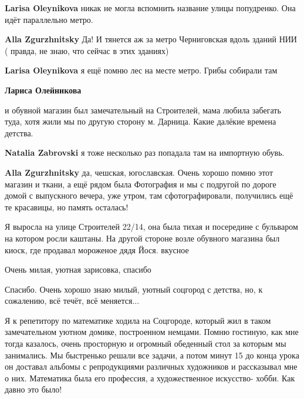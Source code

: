 \begin{itemize}
\begin{itemize} %
\textbf{Larisa Oleynikova} никак не могла вспомнить название улицы попудренко. Она идёт параллельно метро.

\begin{itemize} %
\textbf{Alla Zgurzhnitsky} Да! И тянется аж за метро Черниговская вдоль зданий НИИ ( правда, не знаю, что сейчас в этих зданиях)

\textbf{Larisa Oleynikova} я ещё помню лес на месте метро. Грибы собирали там
\end{itemize} %

\textbf{Лариса Олейникова} 

и обувной магазин был замечательный на Строителей, мама любила забегать туда,
хотя жили мы по другую сторону м. Дарница. Какие далёкие времена детства.

\begin{itemize} %
\textbf{Natalia Zabrovski} я тоже несколько раз попадала там на импортную обувь.

\textbf{Alla Zgurzhnitsky} да, чешская, югославская. Очень хорошо помню этот магазин и ткани, а ещё рядом была Фотография и мы с подругой по дороге домой с выпускного вечера, уже утром, там сфотографировали, получились ещё те красавицы, но память осталась!
\end{itemize} %

\end{itemize} %


Я выросла на улице Строителей 22/14, она была тихая и посередине с бульваром на
котором росли каштаны. На другой стороне возле обувного магазина был киоск,
где продавал мороженое дядя Йося. вкусное

Очень милая, уютная зарисовка, спасибо

Спасибо. Очень хорошо знаю милый, уютный соцгород с детства, но, к сожалению, всё течёт, всё меняется...


Я к репетитору по математике ходила на Соцгороде, который жил в таком
замечательном уютном домике, построенном немцами. Помню гостиную, как мне тогда
казалось, очень просторную и огромный обеденный стол за которым мы занимались.
Мы быстренько решали все задачи, а потом минут 15 до конца урока он доставал
альбомы с репродукциями различных художников и рассказывал мне о них.
Математика была его профессия, а художественное искусство- хобби. Как давно это
было!


\end{itemize}
